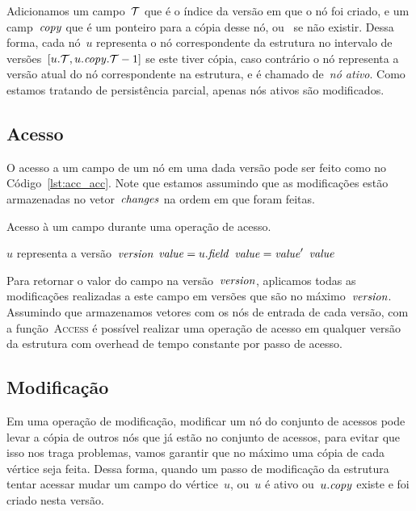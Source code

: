\documentclass[../../main.tex]{subfiles}
\begin{document}
Adicionamos um campo~$\mathcal{T}$ que é o índice da versão em que o nó foi criado, e um camp~$\mathit{copy}$ que é um ponteiro para a cópia desse nó, ou~ se não existir. Dessa forma, cada nó~$u$ representa o nó correspondente da estrutura no intervalo de versões~${[u.\mathcal{T}, u.\mathit{copy}.\mathcal{T} - 1]}$ se este tiver cópia, caso contrário o nó representa a versão atual do nó correspondente na estrutura, e é chamado de~\emph{nó ativo}. Como estamos tratando de persistência parcial, apenas nós ativos são modificados.

\subsection{Acesso}

O acesso a um campo de um nó em uma dada versão pode ser feito como no Código~\ref{lst:acc_acc}. Note que estamos assumindo que as modificações estão armazenadas no vetor~$\mathit{changes}$ na ordem em que foram feitas.

\begin{algorithm}
\caption{Acesso à um campo durante uma operação de acesso.} \label{lst:acc_acc}
\begin{algorithmic}[1]

\Require $u$ representa a versão~$\mathit{version}$
	\State $\mathit{value} = u.\mathit{field}$
			\State $\mathit{value} = \mathit{value}'$
		\EndIf
	\EndFor
	\State \Return $\mathit{value}$
\EndFunction

\end{algorithmic}
\end{algorithm}

Para retornar o valor do campo na versão~$\mathit{version}$, aplicamos todas as modificações realizadas a este campo em versões que são no máximo~$\mathit{version}$. Assumindo que armazenamos vetores com os nós de entrada de cada versão, com a função~\textsc{Access} é possível realizar uma operação de acesso em qualquer versão da estrutura com overhead de tempo constante por passo de acesso.

\subsection{Modificação}

Em uma operação de modificação, modificar um nó do conjunto de acessos pode levar a cópia de outros nós que já estão no conjunto de acessos, para evitar que isso nos traga problemas, vamos garantir que no máximo uma cópia de cada vértice seja feita. Dessa forma, quando um passo de modificação da estrutura tentar acessar mudar um campo do vértice~$u$, ou~$u$ é ativo ou~$u.\mathit{copy}$ existe e foi criado nesta versão.
\end{document}

